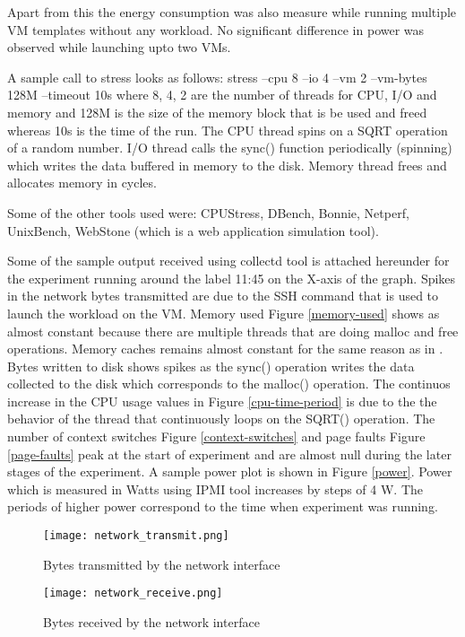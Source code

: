 \documentclass[singlecolumn,letterpaper,12pt]{article}
\begin{document}
Apart from this the energy consumption was also measure while running multiple VM templates without any workload. No significant difference in power was observed while launching upto two VMs.

A sample call to stress looks as follows: stress --cpu 8 --io 4 --vm 2 --vm-bytes 128M --timeout 10s where 8, 4, 2 are the number of threads for CPU, I/O and memory and 128M is the size of the memory block that is be used and freed whereas 10s is the time of the run. The CPU thread spins on a SQRT operation of a random number. I/O thread calls the sync() function periodically (spinning) which writes the data buffered in memory to the disk. Memory thread frees and allocates memory in cycles.

Some of the other tools used were: CPUStress, DBench, Bonnie, Netperf, UnixBench, WebStone (which is a web application simulation tool).

Some of the sample output received using collectd tool is attached hereunder for the experiment running around the label 11:45 on the X-axis of the graph. Spikes in the network bytes transmitted are due to the SSH command that is used to launch the workload on the VM. Memory used Figure \ref{memory-used} shows as almost constant because there are multiple threads that are doing malloc and free operations. Memory caches remains almost constant for the same reason as in \cite{memory-used}. Bytes written to disk shows spikes as the sync() operation writes the data collected to the disk which corresponds to the malloc() operation. The continuos increase in the CPU usage values in Figure \ref{cpu-time-period} is due to the the behavior of the thread that continuously loops on the SQRT() operation. The number of context switches Figure \ref{context-switches} and page faults Figure \ref{page-faults} peak at the start of experiment and are almost null during the later stages of the experiment.  A sample power plot is shown in Figure \ref{power}. Power which is measured in Watts using IPMI tool increases by steps of 4 W. The periods of higher power correspond to the time when experiment was running.

\begin{figure}
\centering
\texttt{[image: network\_transmit.png]}
\caption{Bytes transmitted by the network interface}
\label{network-bytes-transmit}
\end{figure}

\begin{figure}
\centering
\texttt{[image: network\_receive.png]}
\caption{Bytes received by the network interface}
\label{network-bytes-receive}
\end{figure}
\end{document}
